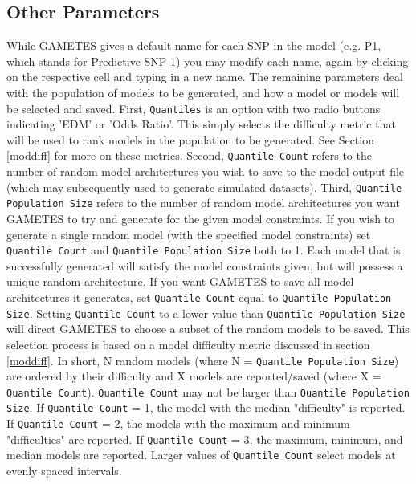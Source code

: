 \documentclass{report}
\begin{document}
\subsection{Other Parameters}\label{oparm}
While GAMETES gives a default name for each SNP in the model (e.g. P1, which stands for Predictive SNP 1) you may modify each name, again by clicking on the respective cell and typing in a new name. The remaining parameters deal with the population of models to be generated, and how a model or models will be selected and saved.  First, \texttt{Quantiles} is an option with two radio buttons indicating 'EDM' or 'Odds Ratio'.  This simply selects the difficulty metric that will be used to rank models in the population to be generated.  See Section \ref{moddiff} for more on these metrics. Second, \texttt{Quantile Count} refers to the number of random model architectures you wish to save to the model output file (which may subsequently used to generate simulated datasets).  Third, \texttt{Quantile Population Size} refers to the number of random model architectures you want GAMETES to try and generate for the given model constraints.  If you wish to generate a single random model (with the specified model constraints) set \texttt{Quantile Count} and \texttt{Quantile Population Size} both to 1.  Each model that is successfully generated will satisfy the model constraints given, but will possess a unique random architecture.   If you want GAMETES to save all model architectures it generates, set \texttt{Quantile Count} equal to \texttt{Quantile Population Size}.  Setting \texttt{Quantile Count} to a lower value than \texttt{Quantile Population Size} will direct GAMETES to choose a subset of the random models to be saved.    This selection process is based on a model difficulty metric discussed in section \ref{moddiff}.  In short, N random models (where N = \texttt{Quantile Population Size}) are ordered by their difficulty and X models are reported/saved (where X = \texttt{Quantile Count}).  \texttt{Quantile Count} may not be larger than \texttt{Quantile Population Size}.  If \texttt{Quantile Count} = 1, the model with the median "difficulty" is reported.  If \texttt{Quantile Count} = 2, the models with the maximum and minimum "difficulties" are reported.  If \texttt{Quantile Count} = 3, the maximum, minimum, and median models are reported.  Larger values of \texttt{Quantile Count} select models at evenly spaced intervals.
\end{document}
